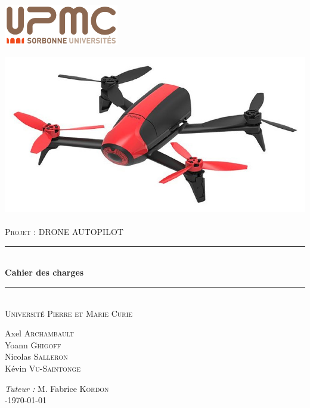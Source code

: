 \documentclass[12pt, openany]{report}
\newcommand{\HRule}{\rule{\linewidth}{0.5mm}}
\begin{document}
\begin{titlepage}
\includegraphics[width=5cm]{upmc.png}
\begin{sffamily}
\begin{center}
\includegraphics[scale=0.4]{img1.jpg}~\\[1cm]
\textsc{\Large Projet : DRONE AUTOPILOT}\\[1cm]

\HRule \\[0.4cm]
	 { \huge \bfseries Cahier des charges\\[0.4cm] }
 \HRule \\[2cm]
 
 \textsc{\LARGE Université Pierre et Marie Curie}\\[3cm]

\begin{minipage}{0.4\textwidth}
\begin{flushleft} \large
Axel \textsc{Archambault}\\
Yoann \textsc{Ghigoff}\\
Nicolas \textsc{Salleron}\\	%
Kévin \textsc{Vu-Saintonge}\\
\end{flushleft}
\end{minipage}
\begin{minipage}{0.4\textwidth}
\begin{flushright} \large
\emph{Tuteur :} M. Fabrice \textsc{Kordon}\\
-\today
\end{flushright}
\end{minipage}

\vfill

\end{center}
\end{sffamily}
\end{titlepage}
\end{document}
